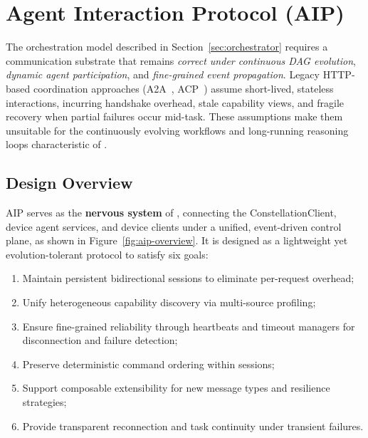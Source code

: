 \section{Agent Interaction Protocol (AIP)} 
\label{sec:aip}
The orchestration model described in Section~\ref{sec:orchestrator} requires a communication substrate that remains \emph{correct under continuous DAG evolution}, \emph{dynamic agent participation}, and \emph{fine-grained event propagation}. Legacy HTTP-based coordination approaches (\eg A2A~\cite{duan2025agent}, ACP~\cite{ehtesham2025survey}) assume short-lived, stateless interactions, incurring handshake overhead, stale capability views, and fragile recovery when partial failures occur mid-task. These assumptions make them unsuitable for the continuously evolving workflows and long-running reasoning loops characteristic of \ufo.

\subsection{Design Overview}
\label{sec:aip:overview}
AIP serves as the \textbf{nervous system} of \ufo, connecting the ConstellationClient, device agent services, and device clients under a unified, event-driven control plane, as shown in Figure~\ref{fig:aip-overview}.
It is designed as a lightweight yet evolution-tolerant protocol to satisfy six goals: 
\begin{enumerate}[label=\textit{(G\arabic*})]
    \item Maintain persistent bidirectional sessions to eliminate per-request overhead;
    \item Unify heterogeneous capability discovery via multi-source profiling;
    \item Ensure fine-grained reliability through heartbeats and timeout managers for disconnection and failure detection;
    \item Preserve deterministic command ordering within sessions;
    \item Support composable extensibility for new message types and resilience strategies;
    \item Provide transparent reconnection and task continuity under transient failures.
\end{enumerate}

